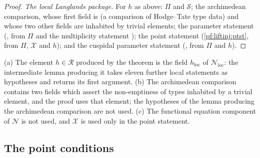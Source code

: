 \begin{proof}
\emph{The local Langlands package.} For $h$ as above: $\Pi$ and $\mathcal S$; the archimedean comparison, whose first field is
 (a comparison of Hodge--Tate type data) and whose two other fields are inhabited by trivial elements; the
parameter statement (, from $\Pi$ and the multiplicity
statement ); the point statement (\cref{pf:liftinj:ptst},
from $\Pi$, $\mathcal X$ and $h$); and the cuspidal parameter statement (, from $\Pi$
and $h$).
\end{proof}

\begin{remark}\label{pf:liftinj:thirdrem}
(a) The element $h\in\mathcal R$ produced by the theorem is the field $h_{\mathrm{loc}}$ of $\mathcal N_{\mathrm{loc}}$: the intermediate lemma producing it takes
eleven further local statements as hypotheses and returns its first argument. (b) The archimedean comparison contains two fields which assert the
non-emptiness of types inhabited by a trivial element, and the proof uses that element; the hypotheses of the lemma producing the archimedean
comparison are not used. (c) The functional equation component of $\mathcal N$ is not used, and $\mathcal X$ is used only in the point statement.
\end{remark}

\subsection{The point conditions}\label{sec:pf:liftinj:D}


